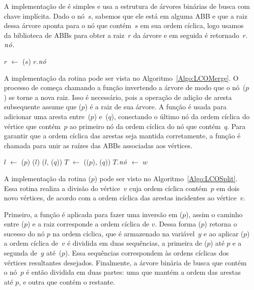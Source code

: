 A implementação de \LCOFindNode{} é simples e usa a estrutura de árvores binárias de busca com chave implícita.
Dado o nó~$s$, sabemos que ele está em alguma ABB e que a raiz dessa árvore aponta para o nó que contém~$s$ em sua ordem cíclica,
logo usamos \treapGetRoot{} da biblioteca de ABBs para obter a raiz~$r$ da árvore e em seguida é retornado~$r$.$\mathit{n\acute{o}}$.

\begin{algorithm}[htb]
\caption{\LCOFindNode($s$)}
\label{Algo:LCOFindNode}
\begin{algorithmic}[1]
\State $r$ $\gets$ \treapGetRoot($s$)
\State \Return $r$.$\mathit{n\acute{o}}$
\end{algorithmic}
\end{algorithm}


A implementação da rotina \LCOMerge{} pode ser vista no Algoritmo~\ref{Algo:LCOMerge}.
O processo de \LCOMerge{} começa chamando a função \linkcutEvert{} invertendo a árvore de modo que o nó~\treapLast($p$) se torne a nova raiz.
Isso é necessário, pois a operação \linkcutAddEdge{} de adição de aresta subsequente assume que \treapLast($p$) é a raiz de sua árvore.
A função \linkcutAddEdge{} é usada para adicionar uma aresta entre~\treapLast($p$) e~\treapFirst($q$), conectando o último nó da ordem cíclica do vértice que contém~$p$ ao primeiro nó da ordem cíclica do nó que contém~$q$.
Para garantir que a ordem cíclica das arestas seja mantida corretamente, a função \treapJoin{} é chamada para unir as raízes das ABBs associadas aos vértices.

\begin{algorithm}[htb]
\caption{\LCOMerge($p$, $q$)}
\label{Algo:LCOMerge}
\begin{algorithmic}[1]
\State $l$ $\gets$ \treapLast($p$)
\State \linkcutEvert($l$)
\State \linkcutAddEdge($l$, \treapFirst($q$))
\State $T$ $\gets$ \treapJoin(\treapGetRoot($p$), \treapGetRoot($q$))
\State $T$.$\mathit{n\acute{o}}$ $\gets$ $w$ 
\end{algorithmic}
\end{algorithm}

A implementação da rotina \LCOSplit($p$) pode ser visto no Algoritmo~\ref{Algo:LCOSplit}.
Essa rotina realiza a divisão do vértice~$v$ cuja ordem cíclica contém~$p$ em dois novo vértices, de acordo com a ordem cíclica das arestas incidentes ao vértice~$v$.

Primeiro, a função \linkcutEvert{} é aplicada para fazer uma inversão em \treapLast($p$), assim o caminho entre \treapFirst($p$) e a raiz corresponde a ordem cíclica de $v$.
Dessa forma \linkcutParent($p$) retorna o sucesso do nó $p$ na ordem cíclica, que é armazenado na variável~$y$ e ao aplicar \linkcutDelEdge($p$) a ordem cíclica de~$v$ é dividida em duas sequências, a primeira de \treapFirst($p$) até $p$ e a segunda de~$y$ até~\treapLast($p$).
Essa sequências correspondem às ordens cíclicas dos vértices resultantes desejados.
Finalmente, a árvore binária de busca que contém o nó~$p$ é então dividida em duas partes: uma que mantém a ordem das arestas até $p$, e outra que contém o restante.

